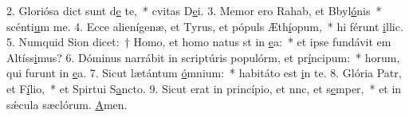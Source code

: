 2. Gloriósa dict sunt d\uline{e} te,~* cvitas D\uline{e}i.
3. Memor ero Rahab, et Bbyl\uline{ó}nis~* scénti\uline{u}m me.
4. Ecce alienígenæ, et Tyrus, et pópuls Æth\uline{í}opum,~* hi férunt \uline{i}llic.
5. Numquid Sion dicet:~† Homo, et homo natus st in \uline{e}a:~* et ipse fundávit em Altíss\uline{i}mus?
6. Dóminus narrábit in scriptúris populórm, et pr\uline{í}ncipum:~* horum, qui furunt in \uline{e}a.
7. Sicut lætántum \uline{ó}mnium:~* habitáto est \uline{i}n te.
8. Glória Patr, et F\uline{í}lio,~* et Spirtui S\uline{a}ncto.
9. Sicut erat in princípio, et nnc, et s\uline{e}mper,~* et in sǽcula sæclórum. \uline{A}men.
